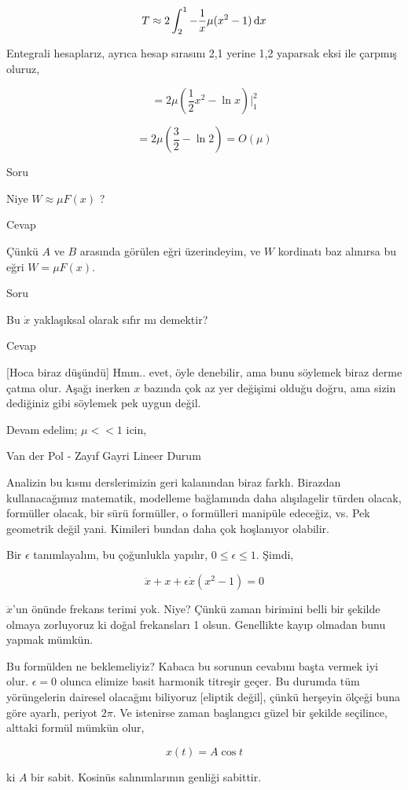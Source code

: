 \documentclass[12pt,fleqn]{article}\usepackage{../../common}
\begin{document}
$$ T \approx 2 \int _{2}^{1} -\frac{1}{x} \mu (x^2-1) \,\mathrm{d} x  $$

Entegrali hesaplarız, ayrıca hesap sırasını 2,1 yerine 1,2 yaparsak eksi ile
çarpmış oluruz,

$$ = 2\mu (\frac{1}{2}x^2 - \ln x) \Big|_{1}^{2} $$

$$ = 2\mu (\frac{3}{2} - \ln 2 ) = O(\mu) $$

Soru

Niye $W \approx \mu F(x)$ ? 

Cevap

Çünkü $A$ ve $B$ arasında görülen eğri üzerindeyim, ve $W$ kordinatı baz
alınırsa bu eğri $W = \mu F(x)$.

Soru

Bu $\dot{x}$ yaklaşıksal olarak sıfır mı demektir?

Cevap

[Hoca biraz düşündü] Hmm.. evet, öyle denebilir, ama bunu söylemek biraz derme
çatma olur. Aşağı inerken $x$ bazında çok az yer değişimi olduğu doğru, ama
sizin dediğiniz gibi söylemek pek uygun değil.

Devam edelim; $\mu << 1$ icin,

Van der Pol - Zayıf Gayri Lineer Durum

Analizin bu kısmı derslerimizin geri kalanından biraz farklı. Birazdan
kullanacağımız matematik, modelleme bağlamında daha alışılagelir türden olacak,
formüller olacak, bir sürü formüller, o formülleri manipüle edeceğiz, vs. Pek
geometrik değil yani. Kimileri bundan daha çok hoşlanıyor olabilir.

Bir $\epsilon$ tanımlayalım, bu çoğunlukla yapılır, $0 \le \epsilon \le
1$. Şimdi,

$$ \ddot{x} + x + \epsilon \dot{x}(x^2 - 1) = 0 $$

$\ddot{x}$'un önünde frekans terimi yok. Niye? Çünkü zaman birimini belli bir
şekilde olmaya zorluyoruz ki doğal frekansları 1 olsun. Genellikte kayıp olmadan
bunu yapmak mümkün. 

Bu formülden ne beklemeliyiz? Kabaca bu sorunun cevabını başta vermek iyi
olur. $\epsilon = 0$ olunca elimize basit harmonik titreşir geçer. Bu durumda
tüm yörüngelerin dairesel olacağını biliyoruz [eliptik değil], çünkü herşeyin
ölçeği buna göre ayarlı, periyot $2\pi$. Ve istenirse zaman başlangıcı güzel bir
şekilde seçilince, alttaki formül mümkün olur, 

$$ x(t) = A \cos t $$

ki $A$ bir sabit. Kosinüs salınımlarının genliği sabittir.
\end{document}
